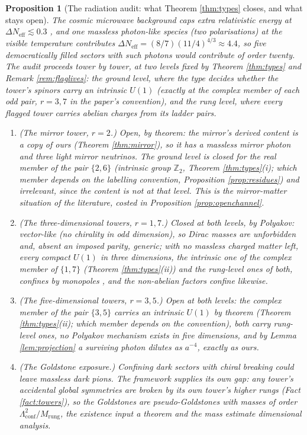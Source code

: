 \documentclass[11pt]{article}
\newtheorem{proposition}[theorem]{Proposition}
\theoremstyle{definition}
\newcommand{\Neff}{N_{\mathrm{eff}}}
\begin{document}
\begin{proposition}[The radiation audit: what Theorem \ref{thm:types} closes, and what stays open]\label{prop:audit}
The cosmic microwave background caps extra relativistic energy at $\Delta\Neff \lesssim 0.3$ \cite{Planck2018}, and one massless photon-like species (two polarisations) at the visible temperature contributes $\Delta\Neff = (8/7)(11/4)^{4/3} \approx 4.4$, so five democratically filled sectors with such photons would contribute of order twenty. The audit proceeds tower by tower, at two levels fixed by Theorem \ref{thm:types} and Remark \ref{rem:flaglives}: the \emph{ground} level, where the type decides whether the tower's spinors carry an intrinsic $U(1)$ (exactly at the complex member of each odd pair, $r = 3, 7$ in the paper's convention), and the \emph{rung} level, where every flagged tower carries abelian charges from its ladder pairs.
\begin{enumerate}
\item \emph{(The mirror tower, $r = 2$.)} Open, by theorem: the mirror's derived content is a copy of ours (Theorem \ref{thm:mirror}), so it has a massless mirror photon and three light mirror neutrinos. The ground level is closed for the real member of the pair $\{2, 6\}$ (intrinsic group $\mathbb{Z}_{2}$, Theorem \ref{thm:types}(i); which member depends on the labelling convention, Proposition \ref{prop:residues}) and irrelevant, since the content is not at that level. This is the mirror-matter situation of the literature, costed in Proposition \ref{prop:openchannel}.
\item \emph{(The three-dimensional towers, $r = 1, 7$.)} Closed at both levels, by Polyakov: vector-like (no chirality in odd dimension), so Dirac masses are unforbidden and, absent an imposed parity, generic; with no massless charged matter left, every compact $U(1)$ in three dimensions, the intrinsic one of the complex member of $\{1, 7\}$ (Theorem \ref{thm:types}(ii)) and the rung-level ones of both, confines by monopoles \cite{Polyakov1977}, and the non-abelian factors confine likewise.
\item \emph{(The five-dimensional towers, $r = 3, 5$.)} Open at both levels: the complex member of the pair $\{3, 5\}$ carries an intrinsic $U(1)$ by theorem (Theorem \ref{thm:types}(ii); which member depends on the convention), both carry rung-level ones, no Polyakov mechanism exists in five dimensions, and by Lemma \ref{lem:projection} a surviving photon dilutes as $a^{-4}$, exactly as ours.
\item \emph{(The Goldstone exposure.)} Confining dark sectors with chiral breaking could leave massless dark pions. The framework supplies its own gap: any tower's accidental global symmetries are broken by its own tower's higher rungs (Fact \ref{fact:towers}), so the Goldstones are pseudo-Goldstones with masses of order $\Lambda_{\mathrm{conf}}^{2}/M_{\mathrm{rung}}$, the existence input a theorem and the mass estimate dimensional analysis.

\end{enumerate}
\end{proposition}
\end{document}
